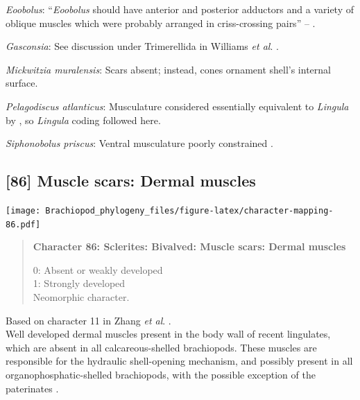 \documentclass[openany]{book}
\begin{document}
\hypertarget{Eoobolus-coding-85}{}
\emph{Eoobolus}: ``\emph{Eoobolus} should have anterior and posterior
adductors and a variety of oblique muscles which were probably arranged
in criss-crossing pairs'' -- \citet{Balthasar2009Thebrachiopod}.

\hypertarget{Gasconsia-coding-85}{}
\emph{Gasconsia}: See discussion under Trimerellida in Williams \emph{et
al}. \citeyearpar{Williams2000LinguliformeaCraniiformea}.

\hypertarget{Mickwitzia_muralensis-coding-85}{}
\emph{Mickwitzia muralensis}: Scars absent; instead, cones ornament
shell's internal surface.

\hypertarget{Pelagodiscus_atlanticus-coding-85}{}
\emph{Pelagodiscus atlanticus}: Musculature considered essentially
equivalent to \emph{Lingula} by
\citet{Williams2000LinguliformeaCraniiformea}, so \emph{Lingula} coding
followed here.

\hypertarget{Siphonobolus_priscus-coding-85}{}
\emph{Siphonobolus priscus}: Ventral musculature poorly constrained
\citep{Williams2000LinguliformeaCraniiformea, Popov2009Earlyontogeny}.

\subsection*{{[}86{]} Muscle scars: Dermal
muscles}\label{muscle-scars-dermal-muscles}

\texttt{[image: Brachiopod\_phylogeny\_files/figure-latex/character-mapping-86.pdf]}

\begin{quote}
\textbf{Character 86: Sclerites: Bivalved: Muscle scars: Dermal muscles}

0: Absent or weakly developed\\
1: Strongly developed\\
Neomorphic character.
\end{quote}

Based on character 11 in Zhang \emph{et al}.
\citeyearpar{Zhang2014Anearly}.\\
Well developed dermal muscles present in the body wall of recent
lingulates, which are absent in all calcareous-shelled brachiopods.
These muscles are responsible for the hydraulic shell-opening mechanism,
and possibly present in all organophosphatic-shelled brachiopods, with
the possible exception of the paterinates
\citep[p.~32]{Williams2000LinguliformeaCraniiformea}.
\end{document}
